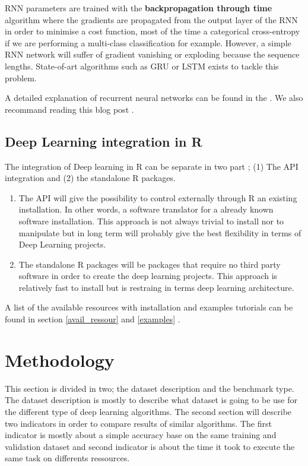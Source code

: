 \documentclass[letter,8pt]{article}\usepackage[]{graphicx}\usepackage[]{color}
\begin{document}
RNN parameters are trained with the \textbf{backpropagation through time} algorithm where the gradients are propagated from the output layer of the RNN in order to minimise a cost function, most of the time a categorical cross-entropy if we are performing a multi-class classification for example. However, a simple RNN network will suffer of gradient vanishing or exploding because the sequence lengths. State-of-art algorithms such as GRU or LSTM exists to tackle this problem.  

A detailed explanation of recurrent neural networks can be found in the  \cite[Chapter 10]{Goodfellow-et-al-2016}. We also recommand reading this blog post \cite{olah_2015}.

\subsection{Deep Learning integration in R}
\label{sec:deepinR}
The integration of Deep learning in R can be separate in two part ; (1) The API integration and (2) the standalone R packages. 
\begin{enumerate}
\item The API will give the possibility to control externally through R an existing installation. In other words, a software translator for a already known software installation. This approach is not always trivial to install nor to manipulate but in long term will probably give the best flexibility in terms of Deep Learning projects.
\item The standalone R packages will be packages that require no third party software in order to create the deep learning projects. This approach is relatively fast to install but is restraing in terms deep learning architecture.
\end{enumerate}
A list of the available resources with installation and examples tutorials can be found in section \ref{avail_ressour} and \ref{examples} .

\section{Methodology}
This section is divided in two;  the dataset description and the benchmark type. The dataset description is mostly to describe what dataset is going to be use for the different type of deep learning algorithms. The second section will describe two indicators in order to compare results of similar algorithms. The first indicator is mostly about a simple accuracy base on the same training and validation dataset and second indicator is about the time it took to execute the same task on differents ressources.
\end{document}
